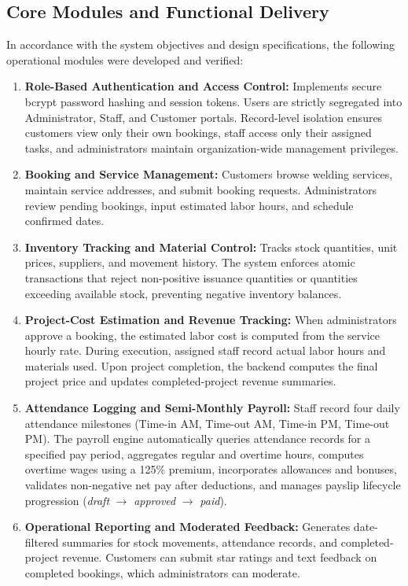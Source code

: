 \documentclass[12pt, letterpaper]{article}
\begin{document}
\subsection{Core Modules and Functional Delivery}
\hspace*{2em} In accordance with the system objectives and design specifications, the following operational modules were developed and verified:
\begin{enumerate}[label=\alph*.]
    \item \textbf{Role-Based Authentication and Access Control:} Implements secure bcrypt password hashing and session tokens. Users are strictly segregated into Administrator, Staff, and Customer portals. Record-level isolation ensures customers view only their own bookings, staff access only their assigned tasks, and administrators maintain organization-wide management privileges.
    \item \textbf{Booking and Service Management:} Customers browse welding services, maintain service addresses, and submit booking requests. Administrators review pending bookings, input estimated labor hours, and schedule confirmed dates.
    \item \textbf{Inventory Tracking and Material Control:} Tracks stock quantities, unit prices, suppliers, and movement history. The system enforces atomic transactions that reject non-positive issuance quantities or quantities exceeding available stock, preventing negative inventory balances.
    \item \textbf{Project-Cost Estimation and Revenue Tracking:} When administrators approve a booking, the estimated labor cost is computed from the service hourly rate. During execution, assigned staff record actual labor hours and materials used. Upon project completion, the backend computes the final project price and updates completed-project revenue summaries.
    \item \textbf{Attendance Logging and Semi-Monthly Payroll:} Staff record four daily attendance milestones (Time-in AM, Time-out AM, Time-in PM, Time-out PM). The payroll engine automatically queries attendance records for a specified pay period, aggregates regular and overtime hours, computes overtime wages using a 125\% premium, incorporates allowances and bonuses, validates non-negative net pay after deductions, and manages payslip lifecycle progression (\textit{draft} $\rightarrow$ \textit{approved} $\rightarrow$ \textit{paid}).
    \item \textbf{Operational Reporting and Moderated Feedback:} Generates date-filtered summaries for stock movements, attendance records, and completed-project revenue. Customers can submit star ratings and text feedback on completed bookings, which administrators can moderate.
\end{enumerate}
\end{document}
